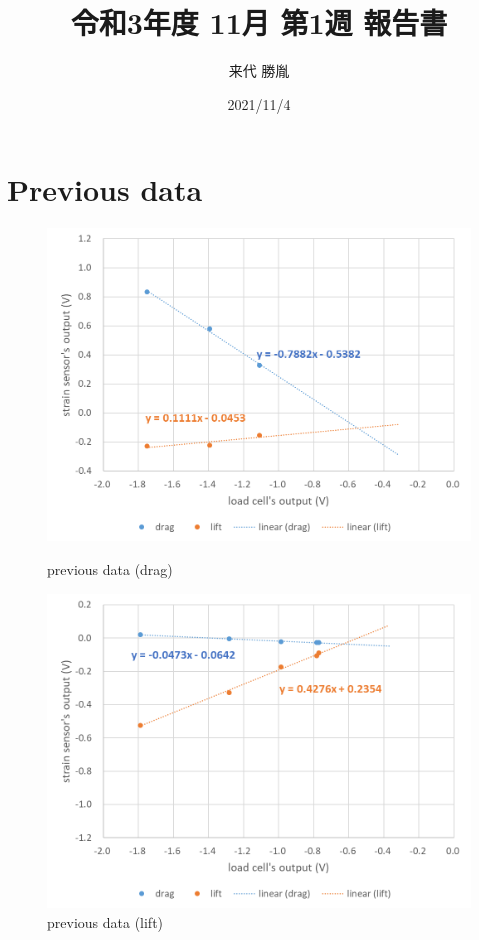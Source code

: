 \documentclass[a4paper]{jsarticle}
\author{来代 勝胤}
\title{令和3年度 11月 第1週 報告書}
\date{2021/11/4}
\begin{document}
\columnseprule=0.1mm

\maketitle
\section{Previous data}
\begin{figure}[htbp]
    \footnotesize
    \begin{center}
        \includegraphics[width=130mm]{../images/previously_drag.png}
        \caption{previous data (drag)}
        \includegraphics[width=130mm]{../images/previously_lift.png}
        \caption{previous data (lift)}
    \end{center}
\end{figure}
\newpage
\end{document}

